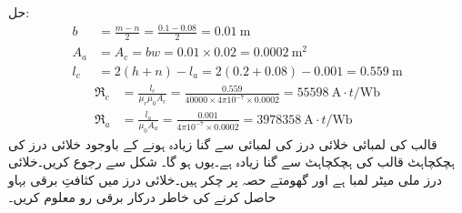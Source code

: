 حل:\quad
\begin{align*}
b&=\frac{m-n}{2}=\frac{0.1-0.08}{2}=\SI{0.01}{\meter}\\
A_a&=A_c=bw=0.01 \times 0.02=\SI{0.0002}{\square \meter}\\
l_c&=2(h+n)-l_a=2(0.2+0.08)-0.001=\SI{0.559}{\meter}
\end{align*}
%
\begin{align*}
\Re_c&=\frac{l_c}{\mu_r \mu_0 A_c}=\frac{0.559}{40000 \times 4 \pi 10^{-7} \times 0.0002}=\SI{55598}{\ampere \cdot t \per \weber}\\
\Re_a&=\frac{l_a}{\mu_0 A_a}=\frac{0.001}{4 \pi 10^{-7} \times 0.0002}=\SI{3978358}{\ampere \cdot t \per \weber}
\end{align*}
قالب کی لمبائی خلائی درز کی لمبائی سے  گنا زیادہ ہونے کے باوجود خلائی درز کی ہچکچاہٹ قالب کی ہچکچاہٹ سے  گنا زیادہ ہے۔یوں   ہو گا۔
%
شکل   سے رجوع کریں۔خلائی درز  ملی میٹر لمبا ہے اور گھومتے حصہ پر  چکر ہیں۔خلائی درز میں  کثافتِ برقی بہاو حاصل کرنے کی خاطر درکار برقی رو معلوم کریں۔
